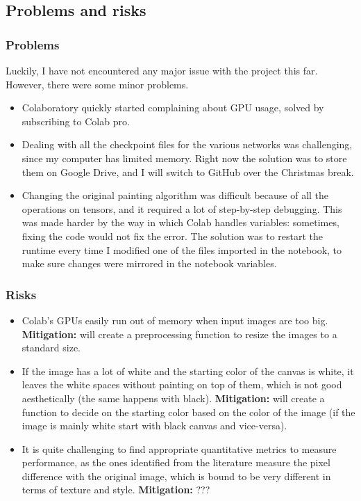\documentclass[11pt]{article}
\begin{document}
\subsection{Problems and risks}\label{problems-and-risks}

\subsubsection{Problems}\label{problems}

Luckily, I have not encountered any major issue with the project this far. However, there were some minor problems. 
\begin{itemize}[parsep=0pt]
    \item Colaboratory quickly started complaining about GPU usage, solved by subscribing to Colab pro.
    \item Dealing with all the checkpoint files for the various networks was challenging, since my computer has limited memory. Right now the solution was to store them on Google Drive, and I will switch to GitHub over the Christmas break.
    \item Changing the original painting algorithm was difficult because of all the operations on tensors, and it required a lot of step-by-step debugging. This was made harder by the way in which Colab handles variables: sometimes, fixing the code would not fix the error. The solution was to restart the runtime every time I modified one of the files imported in the notebook, to make sure changes were mirrored in the notebook variables.
\end{itemize}

\subsubsection{Risks}\label{risks}

\begin{itemize}[parsep=0pt]
    \item Colab's GPUs easily run out of memory when input images are too big. \textbf{Mitigation:} will create a preprocessing function to resize the images to a standard size.
    \item If the image has a lot of white and the starting color of the canvas is white, it leaves the white spaces without painting on top of them, which is not good aesthetically (the same happens with black). \textbf{Mitigation:} will create a function to decide on the starting color based on the color of the image (if the image is mainly white start with black canvas and vice-versa).
    \item It is quite challenging to find appropriate quantitative metrics to measure performance, as the ones identified from the literature measure the pixel difference with the original image, which is bound to be very different in terms of texture and style. \textbf{Mitigation:} ???
\end{itemize}
\end{document}

